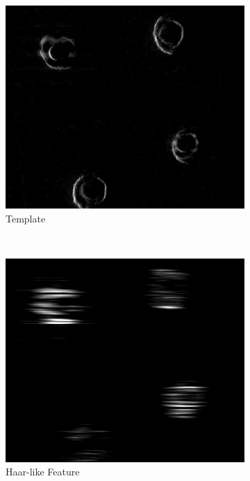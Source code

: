 \begin{figure}[!t]
\begin{subfigure}[h]{0.16\textwidth}
      \includegraphics[width=\textwidth]{pic/bbox/bbox_E_template400_crop.png}
      \caption{Template} \label{fig:bbox_template}
   \end{subfigure}%
   ~
   \begin{subfigure}[h]{0.16\textwidth}
      \includegraphics[width=\textwidth]{pic/bbox/bbox_F_haar400_crop.png}
      \caption{Haar-like Feature} \label{fig:bbox_haar}
   \end{subfigure}%
   ~   
   \begin{subfigure}[h]{0.16\textwidth}

\end{subfigure}
\end{figure}
